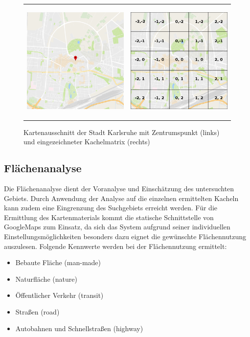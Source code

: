 \begin{figure}
\centering
\begin{tabular}{@{}cc@{}}
    \includegraphics[height=6cm]{images/Karlsruhe_with_center.png} &
    \includegraphics[height=6cm]{images/Karlsruhe_grid.png} \\
\end{tabular}
\caption{Kartenausschnitt der Stadt Karlsruhe mit Zentrumspunkt (links) und eingezeichneter Kachelmatrix (rechts)}
\label{fig:tilemap}
\end{figure}

\subsection{Flächenanalyse}
\label{sec:area-analysis}

Die Flächenanalyse dient der Voranalyse und Einschätzung des untersuchten Gebiets. Durch Anwendung der Analyse auf die einzelnen ermittelten Kacheln kann zudem eine Eingrenzung des Suchgebiets erreicht werden. Für die Ermittlung des Kartenmaterials kommt  die statische Schnittstelle von GoogleMaps zum Einsatz, da sich das System aufgrund seiner individuellen Einstellungsmöglichkeiten besonders dazu eignet die gewünschte Flächennutzung auszulesen. Folgende Kennwerte werden bei der Flächennutzung ermittelt:

\begin{itemize}
\item Bebaute Fläche (man-made)
\item Naturfläche (nature)
\item Öffentlicher Verkehr (transit)
\item Straßen (road)
\item Autobahnen und Schnellstraßen (highway)
\end{itemize}

